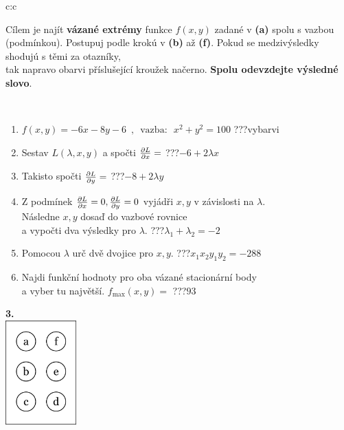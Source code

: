 \documentclass[10pt]{report}
\begin{document}
\begin{tabular}{c:c}
\begin{minipage}[c][104.5mm][t]{0.5\linewidth}
\begin{center}
\begin{minipage}{0.95\linewidth}
\begin{center}
Cílem je najít \textbf{vázané extrémy} funkce $f(x,y)$ zadané v \textbf{(a)} spolu s vazbou (podmínkou). Postupuj podle krokú v \textbf{(b)} až \textbf{(f)}. Pokud se medzivýsledky shodujú s těmi za otazníky,\\tak napravo obarvi příslušející kroužek načerno. \textbf{Spolu odevzdejte výsledné slovo}.
\end{center}
\end{minipage}
\\[1mm]
\begin{minipage}{0.79\linewidth}
\begin{center}
\begin{varwidth}{\linewidth}
\begin{enumerate}
\normalsize
\item $f(x,y)=-6x-8y-6 \enspace , \enspace \mathrm{vazba:} \enspace x^2+y^2=100$\quad \dotfill\; ???\;\dotfill \quad vybarvi
\item Sestav $L(\lambda,x,y)$ a spočti $\pdv{L}{x}=$\quad \dotfill\; ???\;\dotfill \quad $-6+2\lambda x$
\item Takisto spočti $\pdv{L}{y}=$\quad \dotfill\; ???\;\dotfill \quad $-8+2\lambda y$
\item Z podmínek $\pdv{L}{x}=0 , \pdv{L}{y}=0$ vyjádři $x,y$ v závislosti na $\lambda$.\\ \phantom{xxxxxx}Následne $x,y$ dosaď do vazbové rovnice\\ \phantom{xxxxxx}a vypočti dva výsledky pro $\lambda$.\quad \dotfill\; ???\;\dotfill \quad $\lambda_1+\lambda_2=-2$
\item Pomocou $\lambda$ urč dvě dvojice pro $x,y$.\quad \dotfill\; ???\;\dotfill \quad $x_1 x_2 y_1 y_2=-288$
\item Najdi funkční hodnoty pro oba vázané stacionární body\\ \phantom{xxxxxx}a vyber tu najvětší. $f_{\text{max}}(x,y)=$\quad \dotfill\; ???\;\dotfill \quad $93$
\end{enumerate}
\end{varwidth}
\end{center}
\end{minipage}
\begin{minipage}{0.20\linewidth}
\begin{center}
{\Huge\bfseries 3.} \\[2mm]
\includegraphics[height=40mm]{../images/braille.png}

\end{center}
\end{minipage}
\end{center}
\end{minipage}
\end{tabular}
\end{document}
